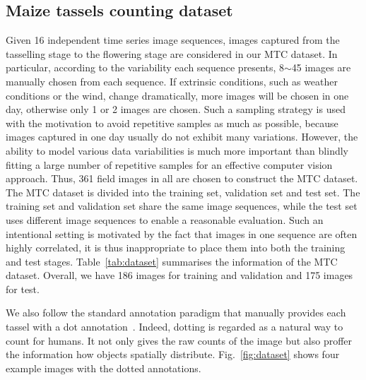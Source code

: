 \documentclass[twocolumn]{bmcart}%
\begin{document}
\subsection*{Maize tassels counting dataset}
Given 16 independent time series image sequences, images captured from the tasselling stage to the flowering stage are considered in our MTC dataset. In particular, according to the variability each sequence presents, 8$\sim$45 images are manually chosen from each sequence. If extrinsic conditions, such as weather conditions or the wind, change dramatically, more images will be chosen in one day, otherwise only 1 or 2 images are chosen. Such a sampling strategy is used with the motivation to avoid repetitive samples as much as possible, because images captured in one day usually do not exhibit many variations. However, the ability to model various data variabilities is much more important than blindly fitting a large number of repetitive samples for an effective computer vision approach. Thus, 361 field images in all are chosen to construct the MTC dataset. The MTC dataset is divided into the training set, validation set and test set. The training set and validation set share the same image sequences, while the test set uses different image sequences to enable a reasonable evaluation. Such an intentional setting is motivated by the fact that images in one sequence are often highly correlated, it is thus inappropriate to place them into both the training and test stages. Table~\ref{tab:dataset} summarises the information of the MTC dataset. Overall, we have 186 images for training and validation and 175 images for test.

We also follow the standard annotation paradigm that manually provides each tassel with a dot annotation~\cite{vlaz2010denlearn}. Indeed, dotting is regarded as a natural way to count for humans. It not only gives the raw counts of the image but also proffer the information how objects spatially distribute. Fig.~\ref{fig:dataset} shows four example images with the dotted annotations.
\end{document}

